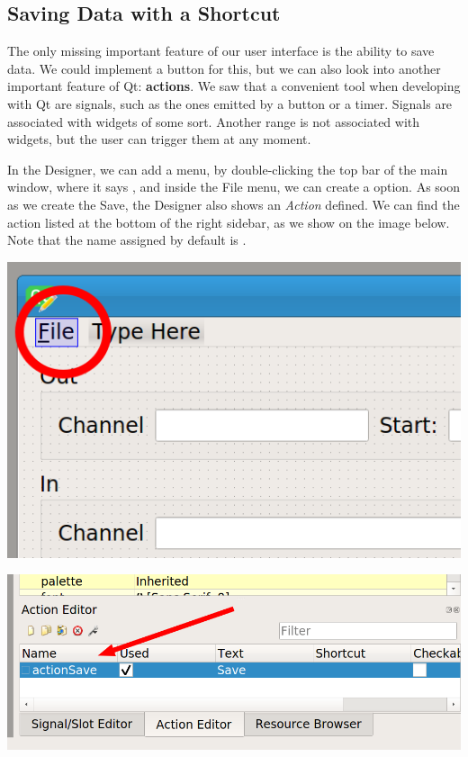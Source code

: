 \subsection{Saving Data with a Shortcut}\label{subsec:saving-data-with-a-shortcut}
The only missing important feature of our user interface is the ability to save data. We could implement a button for this, but we can also look into another important feature of Qt: \textbf{actions}. We saw that a convenient tool when developing with Qt are signals, such as the ones emitted by a button or a timer. Signals are associated with widgets of some sort. Another range is not associated with widgets, but the user can trigger them at any moment.

In the Designer, we can add a  menu, by double-clicking the top bar of the main window, where it says , and inside the File menu, we can create a  option. As soon as we create the Save, the Designer also shows an \emph{Action} defined. We can find the action listed at the bottom of the right sidebar, as we show on the image below. Note that the name assigned by default is .

\begin{minipage}{0.45\linewidth}
    \centering
    \includegraphics[width=\textwidth]{images/Chapter_09/13_menu_file.png}
\end{minipage}
\hspace{0.5cm}
\begin{minipage}{0.45\linewidth}
    \centering
    \includegraphics[width=\textwidth]{images/Chapter_09/13_action_save.png}
\end{minipage}

